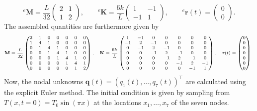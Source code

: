 \documentclass[a4paper,11pt]{article}
\numberwithin{equation}{section}
\newcommand\matr[1]{\ensuremath{\boldsymbol{\mathbf{#1}}}}
\newcommand\vect[1]{\ensuremath{\bm{#1}}}
\begin{document}
{\begin{equation}
{}^e \matr{M} = \frac{L}{32}\begin{pmatrix}
	2 & 1 \\ 1 & 2
\end{pmatrix}, \qquad {}^e \matr{K} = \frac{6k}{L}\begin{pmatrix}
1 & -1 \\ -1 & 1
\end{pmatrix}, \qquad {}^e \vect{r}(t) = \begin{pmatrix}
 0 \\ 0
\end{pmatrix}.
\end{equation} The assembled quantities are furthermore given by \begin{align}\scriptsize\begin{aligned}
\mathbf{M} = \frac{L}{32}
\begin{pmatrix}
	2 & 1 & 0 & 0 & 0 & 0 & 0 \\
	1 & 4 & 1 & 0 & 0 & 0 & 0 \\
	0 & 1 & 4 & 1 & 0 & 0 & 0 \\
	0 & 0 & 1 & 4 & 1 & 0 & 0 \\
	0 & 0 & 0 & 1 & 4 & 1 & 0 \\
	0 & 0 & 0 & 0 & 1 & 4 & 1 \\
	0 & 0 & 0 & 0 & 0 & 1 & 2
\end{pmatrix}, \quad \mathbf{K} = \frac{6k}{L}
\begin{pmatrix}
1 & -1 & 0 & 0 & 0 & 0 & 0 \\
-1 & 2 & -1 & 0 & 0 & 0 & 0 \\
0 & -1 & 2 & -1 & 0 & 0 & 0 \\
0 & 0 & -1 & 2 & -1 & 0 & 0 \\
0 & 0 & 0 & -1 & 2 & -1 & 0 \\
0 & 0 & 0 & 0 & -1 & 2 & -1 \\
0 & 0 & 0 & 0 & 0 & -1 & 1
\end{pmatrix},\quad \mathbf{r}(t) = \begin{pmatrix} 0 \\ 0 \\ 0 \\ 0 \\ 0 \\ 0 \\ 0 \end{pmatrix}.
\end{aligned}\end{align} Now, the nodal unknowns $\vect{q}(t) = (q_1(t),\dots,q_7(t))^\top$ are calculated using the explicit Euler method. The initial condition is given by sampling from $T(x, t=0) = T_0\sin(\pi x)$ at the locations $x_1,\dots,x_7$ of the seven nodes. 
}
\end{document}
